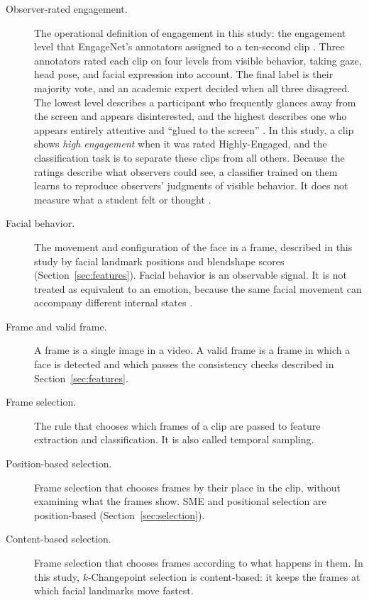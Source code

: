\begin{description}
   \item[Observer-rated engagement.] The operational definition of engagement in this study: the engagement level that EngageNet's annotators assigned to a ten-second clip \cite{singh2023}. Three annotators rated each clip on four levels from visible behavior, taking gaze, head pose, and facial expression into account. The final label is their majority vote, and an academic expert decided when all three disagreed. The lowest level describes a participant who frequently glances away from the screen and appears disinterested, and the highest describes one who appears entirely attentive and ``glued to the screen'' \cite{singh2023}. In this study, a clip shows \emph{high engagement} when it was rated Highly-Engaged, and the classification task is to separate these clips from all others. Because the ratings describe what observers could see, a classifier trained on them learns to reproduce observers' judgments of visible behavior. It does not measure what a student felt or thought \cite{barrett2019}.

   \item[Facial behavior.] The movement and configuration of the face in a frame, described in this study by facial landmark positions and blendshape scores (Section~\ref{sec:features}). Facial behavior is an observable signal. It is not treated as equivalent to an emotion, because the same facial movement can accompany different internal states \cite{barrett2019}.

   \item[Frame and valid frame.] A frame is a single image in a video. A valid frame is a frame in which a face is detected and which passes the consistency checks described in Section~\ref{sec:features}.

   \item[Frame selection.] The rule that chooses which frames of a clip are passed to feature extraction and classification. It is also called temporal sampling.

   \item[Position-based selection.] Frame selection that chooses frames by their place in the clip, without examining what the frames show. SME and positional selection are position-based (Section~\ref{sec:selection}).

   \item[Content-based selection.] Frame selection that chooses frames according to what happens in them. In this study, $k$-Changepoint selection is content-based: it keeps the frames at which facial landmarks move fastest.


\end{description}
